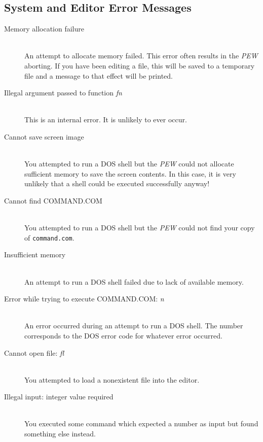 \subsection[System and Editor Error Messages]{System and Editor Error Messages}


\begin{description}
\item[Memory allocation failure]\mbox{}\\
An attempt to allocate memory failed. This error often results in
the {\em PEW} aborting. If you have been editing a file, this will be
saved to a temporary file and a message to that effect will be
printed.

\item[Illegal argument passed to function {\em fn}]\mbox{}\\
This is an internal error. It is unlikely to ever occur.

\item[Cannot save screen image]\mbox{}\\
You attempted to run a DOS shell but the {\em PEW} could not
allocate sufficient memory to save the screen contents. In this
case, it is very unlikely that a shell could be executed successfully
anyway!

\item[Cannot find COMMAND.COM]\mbox{}\\
You attempted to run a DOS shell but the {\em PEW} could not find
your copy of {\tt command.com}.

\item[Insufficient memory]\mbox{}\\
An attempt to run a DOS shell failed due to lack of available
memory.

\item[Error while trying to execute COMMAND.COM: {\em n}]\mbox{}\\
An error occurred during an attempt to run a DOS shell. The number
corresponds to the DOS error code for whatever error occurred.

\item[Cannot open file: {\em fl}]\mbox{}\\
You attempted to load a nonexistent file into the editor.

\item[Illegal input: integer value required]\mbox{}\\
You executed some command which expected a number as input but
found something else instead.


\end{description}
